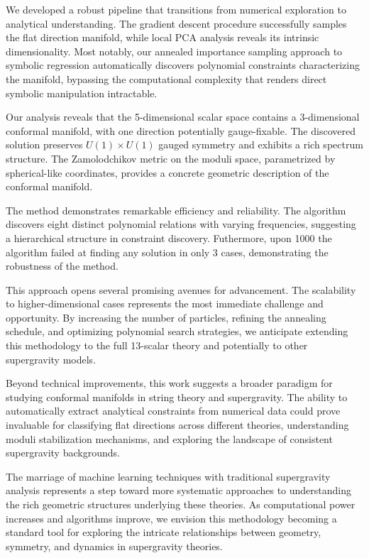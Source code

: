 \documentclass[11pt]{article}
\begin{document}
We developed a robust pipeline that transitions from numerical exploration to analytical understanding. The gradient descent procedure successfully samples the flat direction manifold, while local PCA analysis reveals its intrinsic dimensionality. Most notably, our annealed importance sampling approach to symbolic regression automatically discovers polynomial constraints characterizing the manifold, bypassing the computational complexity that renders direct symbolic manipulation intractable.

Our analysis reveals that the 5-dimensional scalar space contains a 3-dimensional conformal manifold, with one direction potentially gauge-fixable. The discovered solution preserves $U(1) \times U(1)$ gauged symmetry and exhibits a rich spectrum structure. The Zamolodchikov metric on the moduli space, parametrized by spherical-like coordinates, provides a concrete geometric description of the conformal manifold.

The method demonstrates remarkable efficiency and reliability. The algorithm discovers eight distinct polynomial relations with varying frequencies, suggesting a hierarchical structure in constraint discovery. Futhermore, upon 1000 the algorithm failed at finding any solution in only 3 cases, demonstrating the robustness of the method. 

This approach opens several promising avenues for advancement. The scalability to higher-dimensional cases represents the most immediate challenge and opportunity. By increasing the number of particles, refining the annealing schedule, and optimizing polynomial search strategies, we anticipate extending this methodology to the full 13-scalar theory and potentially to other supergravity models.

Beyond technical improvements, this work suggests a broader paradigm for studying conformal manifolds in string theory and supergravity. The ability to automatically extract analytical constraints from numerical data could prove invaluable for classifying flat directions across different theories, understanding moduli stabilization mechanisms, and exploring the landscape of consistent supergravity backgrounds.

The marriage of machine learning techniques with traditional supergravity analysis represents a step toward more systematic approaches to understanding the rich geometric structures underlying these theories. As computational power increases and algorithms improve, we envision this methodology becoming a standard tool for exploring the intricate relationships between geometry, symmetry, and dynamics in supergravity theories.
\end{document}
